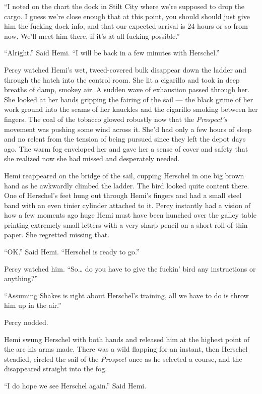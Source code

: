 \documentclass[
]{scrbook}
\begin{document}
``I noted on the chart the dock in Stilt City where we're supposed to
drop the cargo. I guess we're close enough that at this point, you
should should just give him the fucking dock info, and that our expected
arrival is 24 hours or so from now. We'll meet him there, if it's at all
fucking possible.''

``Alright.'' Said Hemi. ``I will be back in a few minutes with
Herschel.''

Percy watched Hemi's wet, tweed-covered bulk disappear down the ladder
and through the hatch into the control room. She lit a cigarillo and
took in deep breaths of damp, smokey air. A sudden wave of exhaustion
passed through her. She looked at her hands gripping the fairing of the
sail --- the black grime of her work ground into the seams of her
knuckles and the cigarillo smoking between her fingers. The coal of the
tobacco glowed robustly now that the \emph{Prospect's} movement was
pushing some wind across it. She'd had only a few hours of sleep and no
relent from the tension of being pursued since they left the depot days
ago. The warm fog enveloped her and gave her a sense of cover and safety
that she realized now she had missed and desperately needed.

Hemi reappeared on the bridge of the sail, cupping Herschel in one big
brown hand as he awkwardly climbed the ladder. The bird looked quite
content there. One of Herschel's feet hung out through Hemi's fingers
and had a small steel band with an even tinier cylinder attached to it.
Percy instantly had a vision of how a few moments ago huge Hemi must
have been hunched over the galley table printing extremely small letters
with a very sharp pencil on a short roll of thin paper. She regretted
missing that.

``OK.'' Said Hemi. ``Herschel is ready to go.''

Percy watched him. ``So\ldots{} do you have to give the fuckin' bird any
instructions or anything?''

``Assuming Shakes is right about Herschel's training, all we have to do
is throw him up in the air.''

Percy nodded.

Hemi swung Herschel with both hands and released him at the highest
point of the arc his arms made. There was a wild flapping for an
instant, then Herschel steadied, circled the sail of the \emph{Prospect}
once as he selected a course, and the disappeared straight into the fog.

``I do hope we see Herschel again.'' Said Hemi.
\end{document}
